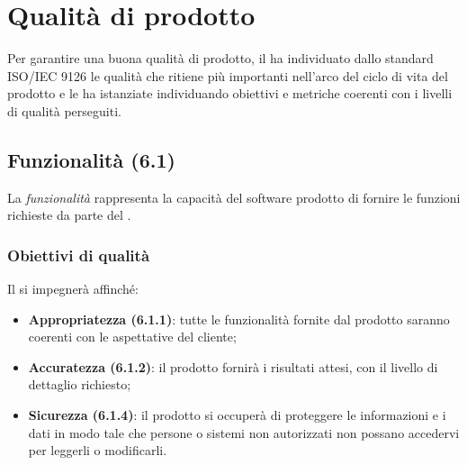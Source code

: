 \section{Qualità di prodotto}
\label{qualitaProdotto}
Per garantire una buona qualità di prodotto, il  ha individuato dallo standard ISO/IEC 9126 le qualità che ritiene più importanti nell'arco del ciclo di vita del prodotto e le ha istanziate individuando obiettivi e metriche coerenti con i livelli di qualità perseguiti.
\subsection{Funzionalità (6.1)}
\label{funzionalita}
La \emph{funzionalità} rappresenta la capacità del software prodotto di fornire le funzioni richieste da parte del .
\subsubsection{Obiettivi di qualità}
Il  si impegnerà affinché:
\begin{itemize}
\item \textbf{Appropriatezza (6.1.1)}: tutte le funzionalità fornite dal prodotto saranno coerenti con le aspettative del cliente;
\item \textbf{Accuratezza (6.1.2)}: il prodotto fornirà i risultati attesi, con il livello di dettaglio richiesto;
\item \textbf{Sicurezza (6.1.4)}: il prodotto si occuperà di proteggere le informazioni e i dati in modo tale che persone o sistemi non autorizzati non possano accedervi per leggerli o modificarli.
\end{itemize}
